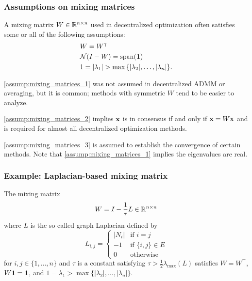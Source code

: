 \documentclass[10pt,mathserif]{beamer}
\begin{document}
\begin{frame}
\frametitle{Assumptions on mixing matrices}
A mixing matrix $W\in \mathbb{R}^{n\times n}$ used in decentralized optimization often satisfies some or all of the following assumptions:
\begin{subequations}\label{assump:mixing_matrices}
  \begin{align}
    & W=W^\intercal \label{assump:mixing_matrices_1}\\
    & \mathcal{N}(I-W)=\mathrm{span}(\vone) \label{assump:mixing_matrices_2}\\
    & 1=|\lambda_1|>\max{\{|\lambda_2|,\dots,|\lambda_n|\}}.\label{assump:mixing_matrices_3}
  \end{align}
\end{subequations}

\vspace{0.2in}


\eqref{assump:mixing_matrices_1} was not assumed in decentralized ADMM or averaging, but it is common; methods with symmetric $W$ tend to be easier to analyze.

\eqref{assump:mixing_matrices_2} implies ${\mathbf{x}}$ is in consensus if and only if ${\mathbf{x}}=W{\mathbf{x}}$ and is required for almost all decentralized optimization methods.

\eqref{assump:mixing_matrices_3} is assumed to establish the convergence of certain methods.
Note that 
\eqref{assump:mixing_matrices_1} implies the eigenvalues are real.
\end{frame}



\begin{frame}
\frametitle{Example: Laplacian-based mixing matrix}
The mixing matrix
\[
W=I-\frac{1}{\tau}L\in \mathbb{R}^{n\times n}
\]
where $L$ is the so-called graph Laplacian defined by
\[
L_{i,j}=\left\{
\begin{array}{ll}
|N_i|&\text{if }{i=j}\\
-1&\text{if }{\{i,j\}\in E}\\
0&\text{otherwise}
\end{array}
\right.
\]
for $i,j\in \{1,\dots,n\}$ and $\tau$ is a constant satisfying $\tau>\frac{1}{2}\lambda_\mathrm{max}(L)$ satisfies $W=W^\intercal$, $W{\mathbf{1}}={\mathbf{1}}$, and $1=\lambda_1>\max{\{|\lambda_2|,\dots,|\lambda_n|\}}$.
\end{frame}
\end{document}
